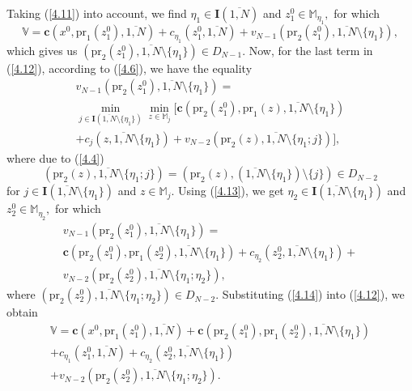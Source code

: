 Taking (\ref{4.11}) into account, we find
$\eta_1 \in \mathbf{I}(\overline{1,N})$ and $z_1^0 \in \mathbb{M}_{\eta_1},$
for which
\begin{equation}\label{4.12}
  \mathbb{V} = \mathbf{c}(x^0,\mathrm{pr}_1(z_1^0),\overline{1,N}) +
  c_{\eta_1}(z_1^0,\overline{1,N}) +
  v_{N-1}(\mathrm{pr}_2(z_1^0),\overline{1,N} \setminus \{\eta_1\}),
\end{equation}
which gives us
$(\mathrm{pr}_2(z_1^0),\overline{1,N} \setminus \{\eta_1\}) \in D_{N-1}$.
Now,
for the last term in (\ref{4.12}),
according to (\ref{4.6}),
we have the equality
\begin{multline}
  \label{4.13}
  v_{N-1}(\mathrm{pr}_2(z_1^0),\overline{1,N}  \setminus \{\eta_1\}) =
  \\
  \min\limits_{j \in \mathbf{I}(\overline{1,N} \setminus \{\eta_1\})}
  \min\limits_{z \in \mathbb{M}_j}
  \big [
    \mathbf{c}(\mathrm{pr}_2(z_1^0),\mathrm{pr}_1(z),\overline{1,N} \setminus \{\eta_1\})
    \\
    + c_j(z,\overline{1,N} \setminus \{\eta_1\}) +
    v_{N-2}(\mathrm{pr}_2(z),\overline{1,N} \setminus \{\eta_1;j\})
  \big ],
\end{multline}
where due to
 (\ref{4.4})
$$
(\mathrm{pr}_2(z),\overline{1,N} \setminus \{\eta_1;j\}) =
(\mathrm{pr}_2(z),(\overline{1,N} \setminus \{\eta_1\}) \setminus \{j\}) \in D_{N-2}
$$
for
$j \in \mathbf{I}(\overline{1,N} \setminus \{\eta_1\})$ and $z \in \mathbb{M}_j.$
Using (\ref{4.13}),
we get
$\eta_2 \in \mathbf{I}(\overline{1,N} \setminus \{\eta_1\})$ and $z_2^0 \in \mathbb{M}_{\eta_2},$
for which
\begin{multline}
  \label{4.14}
  v_{N-1}(\mathrm{pr}_2(z_1^0),\overline{1,N} \setminus \{\eta_1\}) =
  \\
  \mathbf{c}(\mathrm{pr}_2(z_1^0),\mathrm{pr}_1(z_2^0),\overline{1,N}
  \setminus \{\eta_1\}) + c_{\eta_2}(z_2^0,\overline{1,N}
  \setminus \{\eta_1\})
  + \\
  v_{N-2}(\mathrm{pr}_2(z_2^0),\overline{1,N} \setminus
  \{\eta_1;\eta_2\}),
\end{multline}
where
$(\mathrm{pr}_2(z_2^0),\overline{1,N} \setminus \{\eta_1;\eta_2\}) \in D_{N-2}.$
Substituting (\ref{4.14}) into (\ref{4.12}), we obtain
\begin{equation}\label{4.15}
  \begin{array}{c}
    \mathbb{V} =
    \mathbf{c}(x^0,\mathrm{pr}_1(z_1^0),\overline{1,N}) +
    \mathbf{c}(\mathrm{pr}_2(z_1^0),\mathrm{pr}_1(z_2^0),\overline{1,N} \setminus \{\eta_1\})\\
    + c_{\eta_1}(z_1^0,\overline{1,N}) + c_{\eta_2}(z_2^0,\overline{1,N} \setminus \{\eta_1\})
    \\
    + v_{N-2}(\mathrm{pr}_2(z_2^0),\overline{1,N} \setminus \{\eta_1;\eta_2\}).
  \end{array}
\end{equation}

